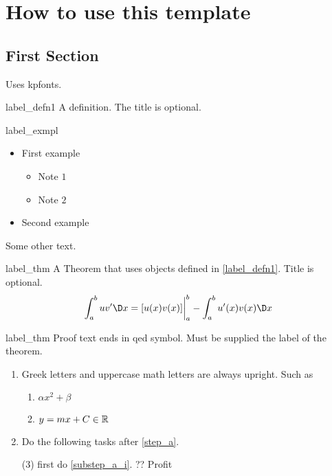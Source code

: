 \chapter{How to use this template}

\section{First Section}

Uses kpfonts.

\begin{defn}{label_defn1}
	A definition. The title is optional.
\end{defn}



\begin{exmpl}[Title]{label_exmpl}
	\begin{itemize}
		\item First example 
		\begin{itemize}
			\item  Note $1$
			\item  Note $2$
		\end{itemize}
		\item Second example
	\end{itemize}
\end{exmpl}    



Some other text.

\begin{theo}{label_thm}
	A Theorem that uses objects defined in \cref{label_defn1}. Title is optional. 
	\[\dint_a^b u v' \dx = [u(x)v(x)] \eval_a^b - \dint_a^b u'(x) v(x) \dx\]
\end{theo}


\begin{prf}{label_thm}
	Proof text ends in qed symbol. Must be supplied the label of the theorem.
\end{prf}


\begin{exercise}\label{question_label}
	\begin{enumerate}
		\item Greek letters and uppercase math letters are always upright. Such as \label{step_a}
		\begin{enumerate}
			\item  $\alpha x^2 +\beta$ \label{substep_a_i} 
			\item  $y =mx+ C \in \mathbb{R}$ 
		\end{enumerate}
		
		\item Do the  following tasks after \ref{step_a}.
		\begin{tasks}(3)
			\task first do \ref{substep_a_i}.
			\task ??    
			\task Profit
		\end{tasks}
\end{enumerate}
\end{exercise}

